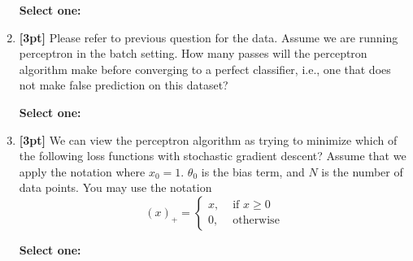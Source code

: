 \documentclass[12pt]{article}
\renewcommand{\circle}{\tikz\draw[black] (0,0) circle (1ex);}
\begin{document}
\begin{enumerate}
    \textbf{Select one:}
    \begin{list}{}
        \item $\circle$ $[1,-2]$
        \item $\circle$ $[2,0]$
        \item $\circle$ $[-1,1]$
        \item $\circle$ $[1,-3]$
    \end{list}

    
    
    \clearpage

    \item \textbf{[3pt]} Please refer to previous question for the data. Assume we are running perceptron in the batch setting. How many passes will the perceptron algorithm make before converging to a perfect classifier, i.e., one that does not make false prediction on this dataset?

    \textbf{Select one:}

    
    
    \item \textbf{[3pt]} We can view the perceptron algorithm as trying to minimize which of the following loss functions with stochastic gradient descent? Assume that we apply the notation where $x_0 = 1$. $\theta_0$ is the bias term, and $N$ is the number of data points. You may use the notation
    $$
    (x)_+ =
    \begin{cases}
    x, & \textrm{ if } x \geq 0 \\
    0, & \textrm{ otherwise}
    \end{cases}
    $$

    \textbf{Select one:}


\end{enumerate}
\end{document}
